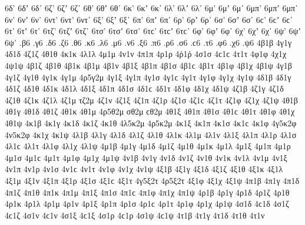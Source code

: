 {6δ' 6δʼ 6δ᾿ 
6ζ' 6ζʼ 6ζ᾿ 
6θ' 6θʼ 6θ᾿ 
6κ' 6κʼ 6κ᾿ 
6λ' 6λʼ 6λ᾿ 
6μ' 6μʼ 6μ᾿ 
6μπ' 6μπʼ 6μπ᾿ 
6ν' 6νʼ 6ν᾿ 
6ντ' 6ντ’ 6ντ᾿
6ξ' 6ξʼ 6ξ᾿ 
6π' 6πʼ 6π᾿ 
6ρ' 6ρʼ 6ρ᾿ 
6σ' 6σʼ 6σ᾿ 6ϲ' 6ϲʼ 6ϲ᾿ 
6τ' 6τʼ 6τ᾿ 
6τζ' 6τζʼ 6τζ᾿ 
6τσ' 6τσʼ 6τσ᾽ 6τϲ' 6τϲʼ 6τϲ᾿ 
6φ' 6φʼ 6φ᾿ 
6χ' 6χʼ 6χ᾿ 
6ψ' 6ψʼ 6ψ᾿  
.β6 
.γ6 
.δ6 
.ζ6 
.θ6 
.κ6 
.λ6 
.μ6 
.ν6 
.ξ6 
.π6 
.ρ6 
.σ6 .ϲ6 
.τ6 
.φ6 
.χ6 
.ψ6 
4β1β 
4γ1γ 
4δ1δ 
4ζ1ζ 
4θ1θ 
4κ1κ 
4λ1λ 
4μ1μ 
4ν1ν 
4π1π 
4ρ1ρ 
4ῤ1ῥ 
4σ1σ 4ϲ1ϲ 
4τ1τ 
4φ1φ 
4χ1χ 
4ψ1ψ 
4β1ζ 
4β1θ 
4β1κ 
4β1μ 
4β1ν 
4β1ξ 
4β1π 
4β1σ 4β1ϲ 
4β1τ 
4β1φ 
4β1χ 
4β1ψ 
4γ1β 
4γ1ζ 
4γ1θ 
4γ1κ 
4γ1μ 
4ρ5γ2μ   %
4γ1ξ 
4γ1π 
4γ1σ 4γ1ϲ 
4γ1τ 
4γ1φ 
4γ1χ 
4γ1ψ 
4δ1β 
4δ1γ 
4δ1ζ 
4δ1θ 
4δ1κ 
4δ1λ 
4δ1ξ 
4δ1π 
4δ1σ 4δ1ϲ 
4δ1τ 
4δ1φ 
4δ1χ 
4δ1ψ 
4ζ1β   %
4ζ1γ   %
4ζ1δ 
4ζ1θ 
4ζ1κ 
4ζ1λ 
4ζ1μ 
τζ2μ   %
4ζ1ν 
4ζ1ξ 
4ζ1π 
4ζ1ρ 
4ζ1σ 4ζ1ϲ 
4ζ1τ 
4ζ1φ 
4ζ1χ 
4ζ1ψ 
4θ1β 
4θ1γ 
4θ1δ 
4θ1ζ 
4θ1κ 
4θ1μ 
4ρ5θ2μ   %
σθ2μ ϲθ2μ   %
4θ1ξ 
4θ1π 
4θ1σ 4θ1ϲ 
4θ1τ 
4θ1φ 
4θ1χ 
4θ1ψ 
4κ1β   %
4κ1γ 
4κ1δ 
4κ1ζ 
4κ1θ 
4λ5κ2μ   %
4ρ5κ2μ   %
4κ1ξ 
4κ1π 
4κ1σ 4κ1ϲ 
4κ1φ 
4γ5κ2φ   %
4ν5κ2φ   %
4κ1χ 
4κ1ψ 
4λ1β 
4λ1γ 
4λ1δ 
4λ1ζ 
4λ1θ 
4λ1κ 
4λ1μ 
4λ1ν 
4λ1ξ 
4λ1π 
4λ1ρ 
4λ1σ 4λ1ϲ 
4λ1τ 
4λ1φ 
4λ1χ 
4λ1ψ 
4μ1β 
4μ1γ 
4μ1δ 
4μ1ζ 
4μ1θ 
4μ1κ 
4μ1λ 
4μ1ξ 
4μ1π 
4μ1ρ 
4μ1σ 4μ1ϲ 
4μ1τ 
4μ1φ 
4μ1χ 
4μ1ψ 
4ν1β 
4ν1γ 
4ν1δ 
4ν1ζ 
4ν1θ 
4ν1κ 
4ν1λ 
4ν1μ 
4ν1ξ 
4ν1π 
4ν1ρ 
4ν1σ 4ν1ϲ 
4ν1τ 
4ν1φ 
4ν1χ 
4ν1ψ 
4ξ1β 
4ξ1γ 
4ξ1δ 
4ξ1ζ 
4ξ1θ 
4ξ1κ 
4ξ1λ 
4ξ1μ 
4ξ1ν 
4ξ1π 
4ξ1ρ 
4ξ1σ 4ξ1ϲ 
4ξ1τ 
4γ5ξ2τ   %
4ρ5ξ2τ   %
4ξ1φ 
4ξ1χ 
4ξ1ψ 
4π1β 
4π1γ 
4π1δ 
4π1ζ 
4π1θ 
4π1κ 
4π1μ 
4π1ξ 
4π1σ 4π1ϲ 
4π1φ 
4π1χ 
4π1ψ 
4ρ1β 
4ρ1γ 
4ρ1δ 
4ρ1ζ 
4ρ1θ 
4ρ1κ 
4ρ1λ 
4ρ1μ 
4ρ1ν 
4ρ1ξ 
4ρ1π 
4ρ1σ 4ρ1ϲ 
4ρ1τ 
4ρ1φ 
4ρ1χ 
4ρ1ψ 
4σ1δ 4ϲ1δ   %
4σ1ζ 4ϲ1ζ 
4σ1ν 4ϲ1ν   %
4σ1ξ 4ϲ1ξ 
4σ1ρ 4ϲ1ρ 
4σ1ψ 4ϲ1ψ 
4τ1β 
4τ1γ 
4τ1δ 
4τ1θ 
4τ1ν 
}
